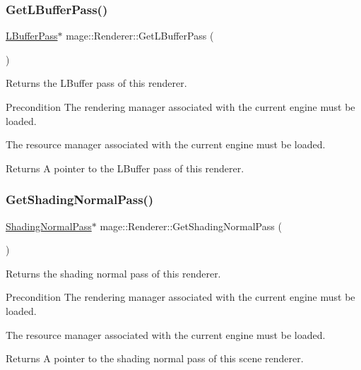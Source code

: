 \subsubsection{\texorpdfstring{Get\+L\+Buffer\+Pass()}{GetLBufferPass()}}
{\footnotesize\ttfamily \hyperlink{classmage_1_1_l_buffer_pass}{L\+Buffer\+Pass}$\ast$ mage\+::\+Renderer\+::\+Get\+L\+Buffer\+Pass (\begin{DoxyParamCaption}{ }\end{DoxyParamCaption})}

Returns the L\+Buffer pass of this renderer.

\begin{DoxyPrecond}{Precondition}
The rendering manager associated with the current engine must be loaded. 

The resource manager associated with the current engine must be loaded. 
\end{DoxyPrecond}
\begin{DoxyReturn}{Returns}
A pointer to the L\+Buffer pass of this renderer. 
\end{DoxyReturn}
\hypertarget{classmage_1_1_renderer_a57e18039593423628715375e7a1b1163}{}\label{classmage_1_1_renderer_a57e18039593423628715375e7a1b1163} 
\subsubsection{\texorpdfstring{Get\+Shading\+Normal\+Pass()}{GetShadingNormalPass()}}
{\footnotesize\ttfamily \hyperlink{classmage_1_1_shading_normal_pass}{Shading\+Normal\+Pass}$\ast$ mage\+::\+Renderer\+::\+Get\+Shading\+Normal\+Pass (\begin{DoxyParamCaption}{ }\end{DoxyParamCaption})}

Returns the shading normal pass of this renderer.

\begin{DoxyPrecond}{Precondition}
The rendering manager associated with the current engine must be loaded. 

The resource manager associated with the current engine must be loaded. 
\end{DoxyPrecond}
\begin{DoxyReturn}{Returns}
A pointer to the shading normal pass of this scene renderer. 
\end{DoxyReturn}
\hypertarget{classmage_1_1_renderer_ad81ae84e11337dc699d4c6fb2d367e4d}{}\label{classmage_1_1_renderer_ad81ae84e11337dc699d4c6fb2d367e4d} 
